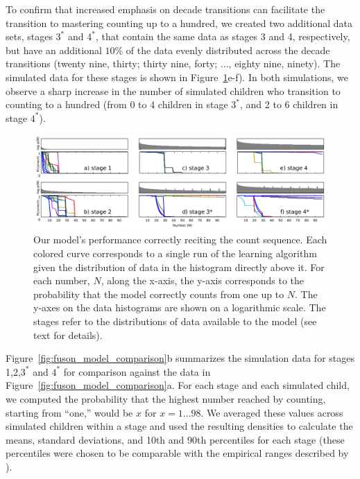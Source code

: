 \documentclass[10pt,letterpaper]{article}
\begin{document}
To confirm that increased emphasis on decade transitions can
facilitate the transition to mastering counting up to a hundred, we
created two additional data sets, stages $3^*$ and $4^*$, that contain the
same data as stages 3 and 4, respectively, but have an additional
$10\%$ of the data evenly distributed across the decade transitions
(twenty nine, thirty; thirty nine, forty; ..., eighty nine,
ninety). The simulated data for these stages is shown in
Figure~\ref{fig:counting_grid}e-f). In both simulations, we observe a
sharp increase in the number of simulated children who transition to
counting to a hundred (from 0 to 4 children in stage $3^*$, and 2 to
6 children in stage $4^*$).

\begin{figure}[t]
  \includegraphics[width=\linewidth]{figures/counting_grid2}
  \caption{Our model's performance correctly reciting the count
    sequence. Each colored curve corresponds to a single run of the learning
    algorithm given the distribution of data in the histogram directly
    above it. For each number, $N$, along the x-axis, the y-axis
    corresponds to the probability that the model correctly counts
    from one up to $N$. The y-axes on the data histograms are shown on
    a logarithmic scale. The stages refer to the distributions of data
    available to the model (see text for details).
  }\label{fig:counting_grid}
\end{figure}


Figure~\ref{fig:fuson_model_comparison}b summarizes the simulation
data for stages 1,2,$3^*$ and $4^*$ for comparison against the
\citeauthor{FusRicBriar1982} data in
Figure~\ref{fig:fuson_model_comparison}a. For each stage and each
simulated child, we computed the probability that the highest number
reached by counting, starting from ``one,'' would be $x$ for $x=1
\dots 98$. We averaged these values across simulated children within a
stage and used the resulting densities to calculate the means,
standard deviations, and 10th and 90th percentiles for each stage
(these percentiles were chosen to be comparable with the empirical
ranges described by \citeauthor{FusRicBriar1982}).
\end{document}
